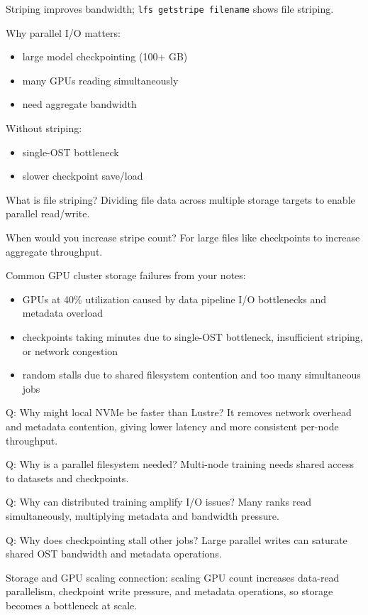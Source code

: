\documentclass[12pt]{article}
\begin{document}
\begin{itemize}
Striping improves bandwidth; \texttt{lfs getstripe filename} shows file striping.

Why parallel I/O matters:
\begin{itemize}
\item large model checkpointing (100+ GB)
\item many GPUs reading simultaneously
\item need aggregate bandwidth
\end{itemize}

Without striping:
\begin{itemize}
\item single-OST bottleneck
\item slower checkpoint save/load
\end{itemize}

What is file striping?  
Dividing file data across multiple storage targets to enable parallel read/write.

When would you increase stripe count?  
For large files like checkpoints to increase aggregate throughput.

Common GPU cluster storage failures from your notes:
\begin{itemize}
\item GPUs at 40\% utilization caused by data pipeline I/O bottlenecks and metadata overload
\item checkpoints taking minutes due to single-OST bottleneck, insufficient striping, or network congestion
\item random stalls due to shared filesystem contention and too many simultaneous jobs
\end{itemize}

Q: Why might local NVMe be faster than Lustre?  
It removes network overhead and metadata contention, giving lower latency and more consistent per-node throughput.

Q: Why is a parallel filesystem needed?  
Multi-node training needs shared access to datasets and checkpoints.

Q: Why can distributed training amplify I/O issues?  
Many ranks read simultaneously, multiplying metadata and bandwidth pressure.

Q: Why does checkpointing stall other jobs?  
Large parallel writes can saturate shared OST bandwidth and metadata operations.

Storage and GPU scaling connection: scaling GPU count increases data-read parallelism, checkpoint write pressure, and metadata operations, so storage becomes a bottleneck at scale.

\end{itemize}
\end{document}
